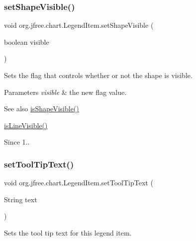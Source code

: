 \subsubsection{\texorpdfstring{set\+Shape\+Visible()}{setShapeVisible()}}
{\footnotesize\ttfamily void org.\+jfree.\+chart.\+Legend\+Item.\+set\+Shape\+Visible (\begin{DoxyParamCaption}\item[{boolean}]{visible }\end{DoxyParamCaption})}

Sets the flag that controls whether or not the shape is visible.


\begin{DoxyParams}{Parameters}
{\em visible} & the new flag value.\\
\hline
\end{DoxyParams}
\begin{DoxySeeAlso}{See also}
\mbox{\hyperlink{classorg_1_1jfree_1_1chart_1_1_legend_item_a549f04415c2224b5c62def05fdcfe3c0}{is\+Shape\+Visible()}} 

\mbox{\hyperlink{classorg_1_1jfree_1_1chart_1_1_legend_item_af99c8d8cee770e72ecddaf3b2cf467b1}{is\+Line\+Visible()}}
\end{DoxySeeAlso}
\begin{DoxySince}{Since}
1.. 
\end{DoxySince}
\mbox{\label{classorg_1_1jfree_1_1chart_1_1_legend_item_ae68b2cb07d9d47a099195c1e53cf7ac8}} 
\subsubsection{\texorpdfstring{set\+Tool\+Tip\+Text()}{setToolTipText()}}
{\footnotesize\ttfamily void org.\+jfree.\+chart.\+Legend\+Item.\+set\+Tool\+Tip\+Text (\begin{DoxyParamCaption}\item[{String}]{text }\end{DoxyParamCaption})}

Sets the tool tip text for this legend item.



